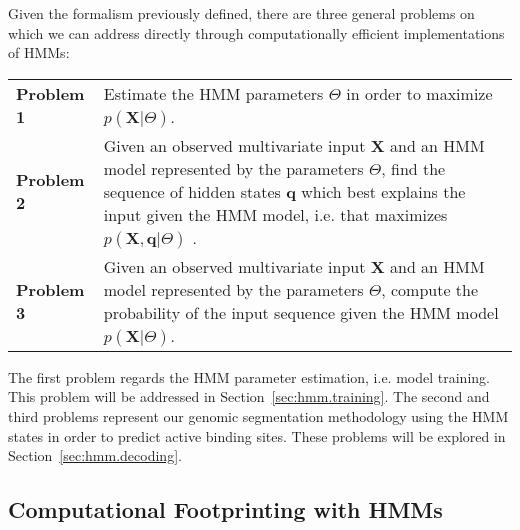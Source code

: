 Given the formalism previously defined, there are three general problems on which we can address directly through computationally efficient implementations of HMMs:

\begin{center}
  \begin{tabular}{lp{.8\linewidth}}
    {\bf Problem 1} & Estimate the HMM parameters $ \Theta $ in order to maximize $p(\mathbf{X} | \Theta)$. \\[0.2cm]
    {\bf Problem 2} & Given an observed multivariate input $ \mathbf{X} $ and an HMM model represented by the parameters $ \Theta $, find the sequence of hidden states $ \mathbf{q} $ which best explains the input given the HMM model, i.e. that maximizes $ p\left( \mathbf{X}, \mathbf{q} | \Theta \right) $ . \\[0.2cm]
    {\bf Problem 3} & Given an observed multivariate input $ \mathbf{X} $ and an HMM model represented by the parameters $ \Theta $, compute the probability of the input sequence given the HMM model $p(\mathbf{X} | \Theta)$. \\[0.2cm]
  \end{tabular}
\end{center}

The first problem regards the HMM parameter estimation, i.e. model training. This problem will be addressed in Section~\ref{sec:hmm.training}. The second and third problems represent our genomic segmentation methodology using the HMM states in order to predict active binding sites. These problems will be explored in Section~\ref{sec:hmm.decoding}.

\subsection{Computational Footprinting with HMMs}
\label{sec:computational.footprinting.hmms}

